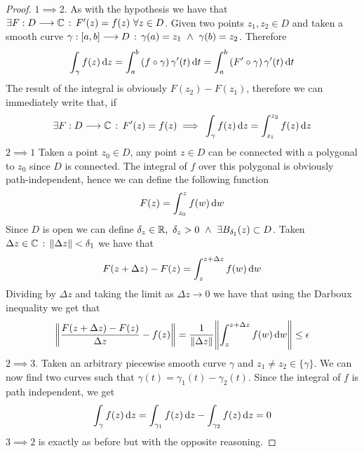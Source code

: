 \documentclass[../complete.tex]{subfiles}
\begin{document}
\begin{proof}
	$1\implies{}2$. As with the hypothesis we have that $\exists F:D\overset{}{\longrightarrow}\mathbb{C}\, :\,  F'(z)=f(z)\ \forall z\in D$. Given two points $z_1,z_2\in D$ and taken a smooth curve $\gamma:[a,b]\overset{}{\longrightarrow} D\, :\, \gamma(a)=z_1\ \wedge\ \gamma(b)=z_2$. Therefore
	\begin{equation*}
		\int_{\gamma}^{}f(z)\operatorname{d\!} z=\int_{a}^{b}\left( f\circ\gamma \right)\gamma'(t)\operatorname{d\!} t=\int_{a}^{b}\left( F'\circ\gamma \right)\gamma'(t)\operatorname{d\!} t
	\end{equation*}
	The result of the integral is obviously $F(z_2)-F(z_1)$, therefore we can immediately write that, if
	\begin{equation*}
		\exists F:D\overset{}{\longrightarrow}\mathbb{C}\, :\,  F'(z)=f(z)\implies{}\int_{\gamma}^{}f(z)\operatorname{d\!} z=\int_{z_1}^{z_2}f(z)\operatorname{d\!} z
	\end{equation*}
	$2\implies{}1$ Taken a point $z_0\in D$, any point $z\in D$ can be connected with a polygonal to $z_0$ since $D$ is connected. The integral of $f$ over this polygonal is obviously path-independent, hence we can define the following function
	\begin{equation*}
		F(z)=\int_{z_0}^{z}f(w)\operatorname{d\!} w
	\end{equation*}
	Since $D$ is open we can define $\delta_z\in\R,\ \delta_z>0\ \wedge\ \exists B_{\delta_1}(z)\subset D$. Taken $\Delta z\in\mathbb{C}\, :\, \norm{\Delta z}<\delta_1$ we have that
	\begin{equation*}
		F(z+\Delta z)-F(z)=\int_{z}^{z+\Delta z}f(w)\operatorname{d\!} w
	\end{equation*}
	Dividing by $\Delta z$ and taking the limit as $\Delta z\to 0$ we have that using the Darboux inequality we get that
	\begin{equation*}
		\norm{\frac{F(z+\Delta z)-F(z)}{\Delta z}-f(z)}=\frac{1}{\norm{\Delta z}}\norm{\int_{z}^{z+\Delta z}f(w)\operatorname{d\!} w}\le\epsilon
	\end{equation*}
	$2\implies{}3$. Taken an arbitrary piecewise smooth curve $\gamma$ and $z_1\ne z_2\in\{\gamma\}$. We can now find two curves such that $\gamma(t)=\gamma_1(t)-\gamma_2(t)$. Since the integral of $f$ is path independent, we get
	\begin{equation*}
		\int_{\gamma}^{}f(z)\operatorname{d\!} z=\int_{\gamma_1}^{}f(z)\operatorname{d\!} z-\int_{\gamma_2}^{}f(z)\operatorname{d\!} z=0
	\end{equation*}
	$3\implies{}2$ is exactly as before but with the opposite reasoning.
\end{proof}
\end{document}
